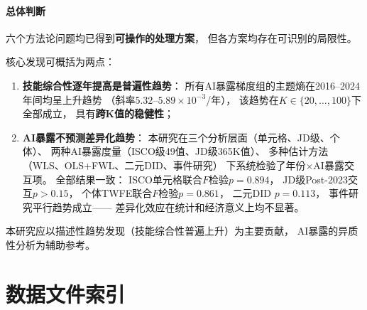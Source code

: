 \documentclass[12pt,a4paper]{ctexart}
\begin{document}
\paragraph{总体判断}
六个方法论问题均已得到\textbf{可操作的处理方案}，
但各方案均存在可识别的局限性。

核心发现可概括为两点：
\begin{enumerate}
\item \textbf{技能综合性逐年提高是普遍性趋势}：
      所有AI暴露梯度组的主题熵在2016--2024年间均呈上升趋势
      （斜率$5.32$--$5.89 \times 10^{-3}$/年），
      该趋势在$K\in\{20,\ldots,100\}$下全部成立，
      具有\textbf{跨K值的稳健性}；
\item \textbf{AI暴露不预测差异化趋势}：
      本研究在三个分析层面（单元格、JD级、个体）、
      两种AI暴露度量（ISCO级49值、JD级365K值）、
      多种估计方法（WLS、OLS+FWL、二元DID、事件研究）
      下系统检验了年份$\times$AI暴露交互项。
      全部结果一致：
      ISCO单元格联合$F$检验$p = 0.894$，
      JD级Post-2023交互$p>0.15$，
      个体TWFE联合$F$检验$p = 0.861$，
      二元DID $p = 0.113$，
      事件研究平行趋势成立——
      差异化效应在统计和经济意义上均不显著。
\end{enumerate}
本研究应以描述性趋势发现（技能综合性普遍上升）为主要贡献，
AI暴露的异质性分析为辅助参考。

\appendix
\section{数据文件索引}
\label{sec:data_files}
\end{document}
